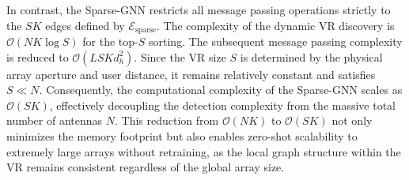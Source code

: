 In contrast, the Sparse-GNN restricts all message passing operations strictly to the $SK$ edges defined by $\mathcal{E}_{\text{sparse}}$. The complexity of the dynamic VR discovery is $\mathcal{O}(NK \log S)$ for the top-$S$ sorting. The subsequent message passing complexity is reduced to $\mathcal{O}(L S K d_h^2)$. Since the VR size $S$ is determined by the physical array aperture and user distance, it remains relatively constant and satisfies $S \ll N$. Consequently, the computational complexity of the Sparse-GNN scales as $\mathcal{O}(SK)$, effectively decoupling the detection complexity from the massive total number of antennas $N$. This reduction from $\mathcal{O}(N K)$ to $\mathcal{O}(S K)$ not only minimizes the memory footprint but also enables zero-shot scalability to extremely large arrays without retraining, as the local graph structure within the VR remains consistent regardless of the global array size.